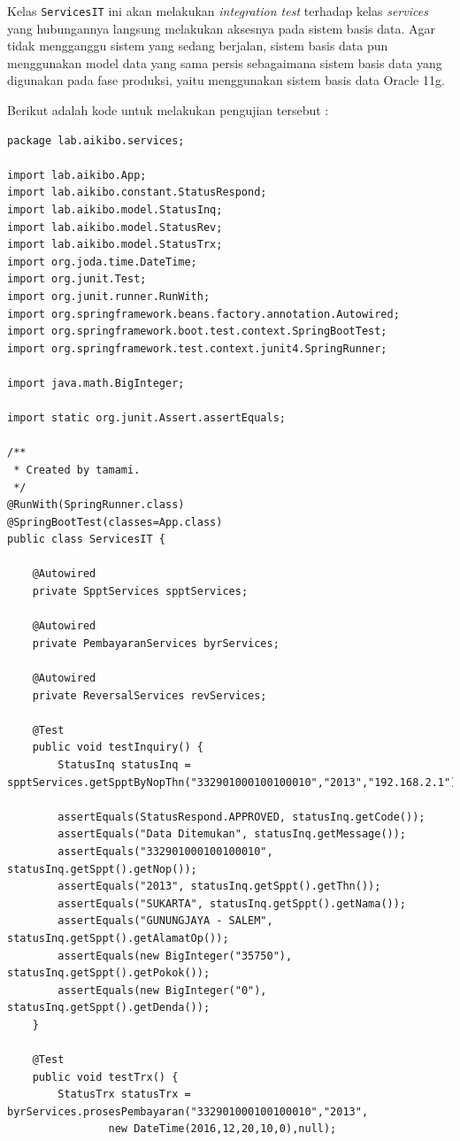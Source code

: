 \documentclass[pdftex,12pt, oneside]{article}
\begin{document}
\begin{enumerate}[A.]
\begin{enumerate}[1.]
    Kelas \texttt{ServicesIT} ini akan melakukan \textit{integration test} terhadap kelas \textit{services} yang hubungannya langsung melakukan aksesnya pada sistem basis data. Agar tidak mengganggu sistem yang sedang berjalan, sistem basis data pun menggunakan model data yang sama persis sebagaimana sistem basis data yang digunakan pada fase produksi, yaitu menggunakan sistem basis data Oracle 11g.
    
    Berikut adalah kode untuk melakukan pengujian tersebut :
    
    \begin{lstlisting}
package lab.aikibo.services;

import lab.aikibo.App;
import lab.aikibo.constant.StatusRespond;
import lab.aikibo.model.StatusInq;
import lab.aikibo.model.StatusRev;
import lab.aikibo.model.StatusTrx;
import org.joda.time.DateTime;
import org.junit.Test;
import org.junit.runner.RunWith;
import org.springframework.beans.factory.annotation.Autowired;
import org.springframework.boot.test.context.SpringBootTest;
import org.springframework.test.context.junit4.SpringRunner;

import java.math.BigInteger;

import static org.junit.Assert.assertEquals;

/**
 * Created by tamami.
 */
@RunWith(SpringRunner.class)
@SpringBootTest(classes=App.class)
public class ServicesIT {

    @Autowired
    private SpptServices spptServices;

    @Autowired
    private PembayaranServices byrServices;

    @Autowired
    private ReversalServices revServices;

    @Test
    public void testInquiry() {
        StatusInq statusInq = spptServices.getSpptByNopThn("332901000100100010","2013","192.168.2.1");

        assertEquals(StatusRespond.APPROVED, statusInq.getCode());
        assertEquals("Data Ditemukan", statusInq.getMessage());
        assertEquals("332901000100100010", statusInq.getSppt().getNop());
        assertEquals("2013", statusInq.getSppt().getThn());
        assertEquals("SUKARTA", statusInq.getSppt().getNama());
        assertEquals("GUNUNGJAYA - SALEM", statusInq.getSppt().getAlamatOp());
        assertEquals(new BigInteger("35750"), statusInq.getSppt().getPokok());
        assertEquals(new BigInteger("0"), statusInq.getSppt().getDenda());
    }

    @Test
    public void testTrx() {
        StatusTrx statusTrx = byrServices.prosesPembayaran("332901000100100010","2013",
                new DateTime(2016,12,20,10,0),null);


\end{lstlisting}
\end{enumerate}
\end{enumerate}
\end{document}
